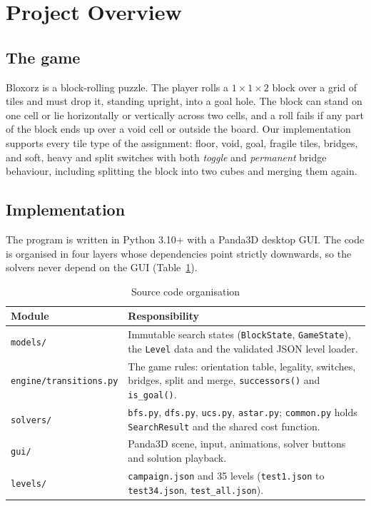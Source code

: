 \section{Project Overview}

\subsection{The game}

Bloxorz is a block-rolling puzzle. The player rolls a $1\times1\times2$ block over a grid of
tiles and must drop it, standing upright, into a goal hole. The block can stand on one cell
or lie horizontally or vertically across two cells, and a roll fails if any part of the block
ends up over a void cell or outside the board. Our implementation supports every tile type of
the assignment: floor, void, goal, fragile tiles, bridges, and soft, heavy and split switches
with both \emph{toggle} and \emph{permanent} bridge behaviour, including splitting the block
into two cubes and merging them again.

\subsection{Implementation}

The program is written in Python 3.10+ with a Panda3D desktop GUI. The code is organised in
four layers whose dependencies point strictly downwards, so the solvers never depend on the GUI
(Table~\ref{tab:modules}).

\begin{table}[H]
\centering
\caption{Source code organisation}
\label{tab:modules}
\begin{tabularx}{\linewidth}{lX}
\toprule
\textbf{Module} & \textbf{Responsibility} \\
\midrule
\texttt{models/} & Immutable search states (\texttt{BlockState}, \texttt{GameState}), the \texttt{Level} data and the validated JSON level loader. \\
\texttt{engine/transitions.py} & The game rules: orientation table, legality, switches, bridges, split and merge, \texttt{successors()} and \texttt{is\_goal()}. \\
\texttt{solvers/} & \texttt{bfs.py}, \texttt{dfs.py}, \texttt{ucs.py}, \texttt{astar.py}; \texttt{common.py} holds \texttt{SearchResult} and the shared cost function. \\
\texttt{gui/} & Panda3D scene, input, animations, solver buttons and solution playback. \\
\texttt{levels/} & \texttt{campaign.json} and 35 levels (\texttt{test1.json} to \texttt{test34.json}, \texttt{test\_all.json}). \\
\bottomrule
\end{tabularx}
\end{table}

